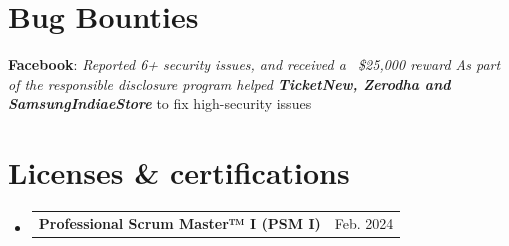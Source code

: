 \documentclass[a4paper,20pt]{article}
\makeatletter
\newcommand{\resumeProjectHeading}[2]{
    \item
    \begin{tabular*}{0.97\textwidth}{l@{\extracolsep{\fill}}r}
      \small#1 & #2 \\
    \end{tabular*}\vspace{-7pt}
}
\newcommand{\resumeSubHeadingListStart}{\begin{itemize}[leftmargin=0.15in, label={}]}
\newcommand{\resumeSubHeadingListEnd}{\end{itemize}}
\makeatother
\begin{document}
\section{Bug Bounties}
 \begin{itemize}[leftmargin=0.15in, label={}]
    \small{\item{\textbf{Facebook}: \textit{Reported 6+ security issues, and received a ~\$25,000 reward As part of the responsible disclosure program helped \textbf{TicketNew, Zerodha and SamsungIndiaeStore}} to fix high-security issues\\
     }}
 \end{itemize}
 

\section{Licenses \& certifications}
  \resumeSubHeadingListStart
	\resumeProjectHeading
        {\textbf{Professional Scrum Master™ I (PSM I)}}{Feb. 2024}
\resumeSubHeadingListEnd
\end{document}
